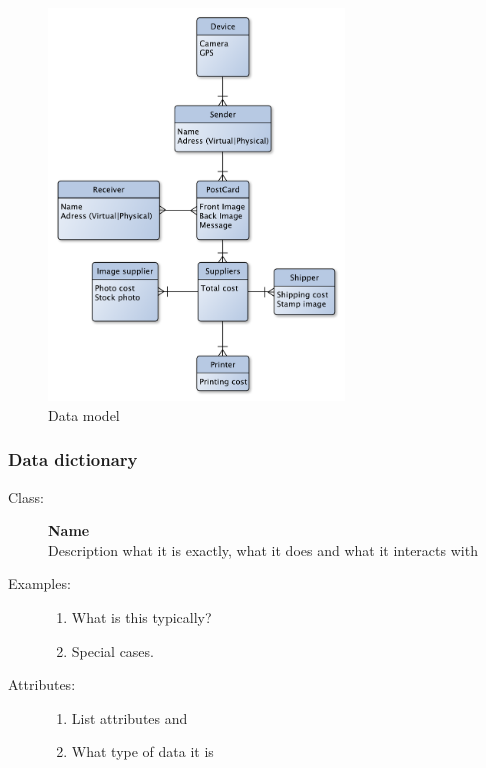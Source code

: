 \documentclass[10pt,a4paper]{article}
\begin{document}
\begin{figure}[h!]
\centering
\includegraphics[width=0.7\textwidth]{DataModel.pdf}
\caption{Data model}
\label{fig:datamodel}
\end{figure}




\subsubsection{Data dictionary}

\begin{description}
\item[Class:] \textbf{Name} \hfill \\
Description what it is exactly, what it does and what it interacts with

\item[Examples:] \hfill
\begin{enumerate}
\item What is this typically?
\item Special cases.
\end{enumerate}

\item[Attributes:] \hfill
\begin{enumerate}
\item List attributes and 
\item What type of data it is
\end{enumerate}
\end{description}
\end{document}
